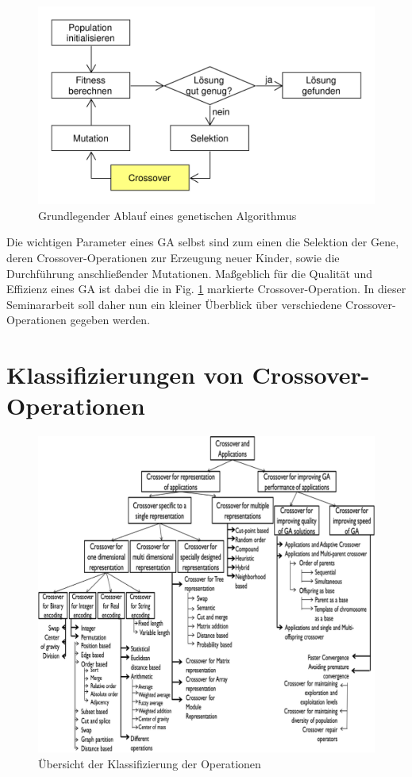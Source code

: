 \documentclass{llncs}
\begin{document}
	\begin{figure}
		\centering
		\includegraphics[width=.8\columnwidth]{./Figures/GA-Prinzip.pdf}
		\caption{Grundlegender Ablauf eines genetischen Algorithmus}
		\label{fig:abb1}
	\end{figure}	

	Die wichtigen Parameter eines GA selbst sind zum einen die Selektion der Gene, deren Crossover-Operationen zur Erzeugung neuer Kinder, sowie die Durchführung anschließender Mutationen. Maßgeblich für die Qualität und Effizienz eines GA ist dabei die in Fig. \ref{fig:abb1} markierte Crossover-Operation. In dieser Seminararbeit soll daher nun ein kleiner Überblick über verschiedene Crossover-Operationen gegeben werden.

\section{Klassifizierungen von Crossover-Operationen}
\label{sec:KlassifizierungCrossover}

	\begin{figure}
		\centering
		\includegraphics[width=.8\columnwidth]{./Figures/Crossover-Klassifizierung-Paper.png}
		\caption{Übersicht der Klassifizierung der Operationen}
		\label{fig:abb2}
	\end{figure}
	
\end{document}
